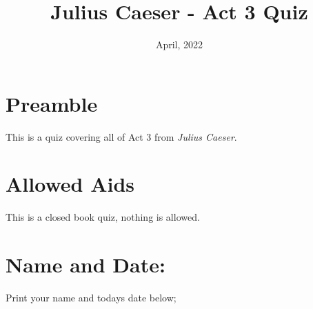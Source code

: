 \documentclass[12pt]{article} %
\title{Julius Caeser - Act 3 Quiz}
\date{April, 2022}
\begin{document}
    \renewcommand*{\coursecode}{MCR3U Quiz} %
    \renewcommand*{\assgnnumber}{2} %
    \renewcommand*{\submdate}{January, 2022} %
    \renewcommand*{\studentfname}{\textbf{Name:}} %
    \renewcommand*{\studentlname}{} %

    \renewcommand\qedsymbol{$\blacksquare$}
    \setfigpath
    \pagestyle{crowdmark}
    \fancyhfoffset[L,O]{0pt} %




	\maketitle
	\section{Preamble}
    This is a quiz covering all of Act 3 from \textit{Julius Caeser}.
	\section{Allowed Aids}
  This is a closed book quiz, nothing is allowed.
	\section{Name and Date:}
	Print your name and todays date below;
\end{document}
